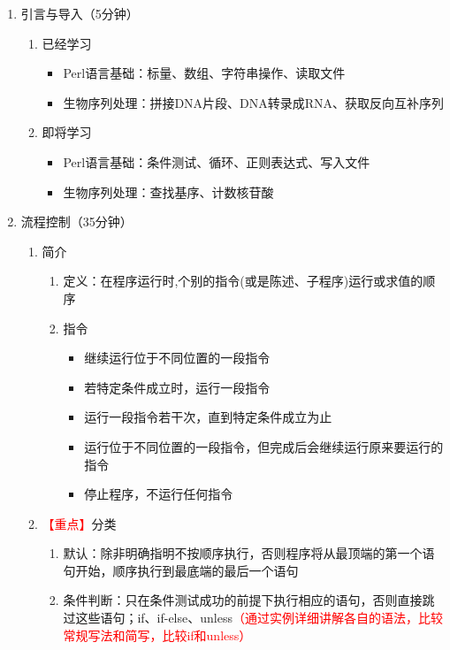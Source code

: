 \documentclass{TIJMUjiaoanLL}
\begin{document}
\begin{enumerate}
  \item 引言与导入（5分钟）
    \begin{enumerate}
      \item 已经学习
	\begin{itemize}
	  \item Perl语言基础：标量、数组、字符串操作、读取文件
	  \item 生物序列处理：拼接DNA片段、DNA转录成RNA、获取反向互补序列
	\end{itemize}
      \item 即将学习
	\begin{itemize}
	  \item Perl语言基础：条件测试、循环、正则表达式、写入文件
	  \item 生物序列处理：查找基序、计数核苷酸
	\end{itemize}
    \end{enumerate}
  \item 流程控制（35分钟）
    \begin{enumerate}
      \item 简介
	\begin{enumerate}
	  \item 定义：在程序运行时,个别的指令(或是陈述、子程序)运行或求值的顺序
	  \item 指令
	    \begin{itemize}
	      \item 继续运行位于不同位置的一段指令
	      \item 若特定条件成立时，运行一段指令
	      \item 运行一段指令若干次，直到特定条件成立为止
	      \item 运行位于不同位置的一段指令，但完成后会继续运行原来要运行的指令
	      \item 停止程序，不运行任何指令
	    \end{itemize}
	\end{enumerate}
      \item \textcolor{red}{【重点】}分类
	\begin{enumerate}
	  \item 默认：除非明确指明不按顺序执行，否则程序将从最顶端的第一个语句开始，顺序执行到最底端的最后一个语句
	  \item 条件判断：只在条件测试成功的前提下执行相应的语句，否则直接跳过这些语句；if、if-else、unless\textcolor{red}{（通过实例详细讲解各自的语法，比较常规写法和简写，比较if和unless）}
	    \begin{itemize}

\end{itemize}
\end{enumerate}
\end{enumerate}
\end{enumerate}
\end{document}
